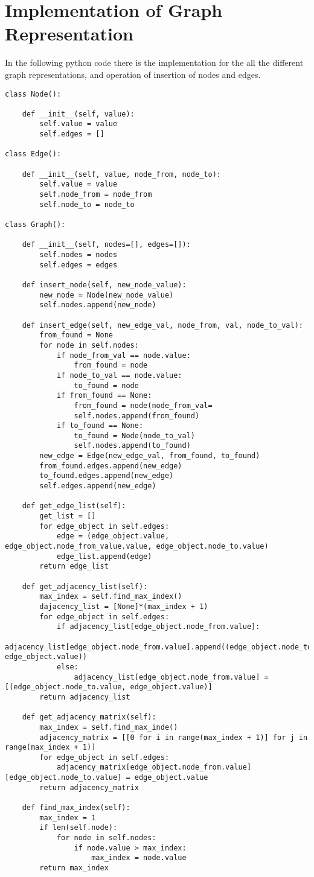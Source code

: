 \chapter{Implementation of Graph Representation}
\label{graphimplementationappendix}
In the following python code there is the implementation for the all the different graph representations, and operation of insertion of nodes and edges.

\begin{lstlisting}[firstnumber=1, caption={Graph representation and fundamental operations.}]
class Node():

	def __init__(self, value):
		self.value = value
		self.edges = []

class Edge():

	def __init__(self, value, node_from, node_to):
		self.value = value
		self.node_from = node_from
		self.node_to = node_to
		
class Graph():
	
	def __init__(self, nodes=[], edges=[]):
		self.nodes = nodes
		self.edges = edges
	
	def insert_node(self, new_node_value):
		new_node = Node(new_node_value)
		self.nodes.append(new_node)
		
	def insert_edge(self, new_edge_val, node_from, val, node_to_val):
		from_found = None
		for node in self.nodes:
			if node_from_val == node.value:
				from_found = node
			if node_to_val == node.value:
				to_found = node
			if from_found == None:
				from_found = node(node_from_val=
				self.nodes.append(from_found)
			if to_found == None:
				to_found = Node(node_to_val)
				self.nodes.append(to_found)
		new_edge = Edge(new_edge_val, from_found, to_found)
		from_found.edges.append(new_edge)
		to_found.edges.append(new_edge)
		self.edges.append(new_edge)
	
	def get_edge_list(self):
		get_list = []
		for edge_object in self.edges:
			edge = (edge_object.value, edge_object.node_from_value.value, edge_object.node_to.value)
			edge_list.append(edge)
		return edge_list
	
	def get_adjacency_list(self):
		max_index = self.find_max_index()
		dajacency_list = [None]*(max_index + 1)
		for edge_object in self.edges:
			if adjacency_list[edge_object.node_from.value]:
				adjacency_list[edge_object.node_from.value].append((edge_object.node_to.value, edge_object.value))
			else:
				adjacency_list[edge_object.node_from.value] = [(edge_object.node_to.value, edge_object.value)]
		return adjacency_list
		
	def get_adjacency_matrix(self):
		max_index = self.find_max_inde()
		adjacency_matrix = [[0 for i in range(max_index + 1)] for j in range(max_index + 1)]
		for edge_object in self.edges:
			adjacency_matrix[edge_object.node_from.value][edge_object.node_to.value] = edge_object.value
		return adjacency_matrix
		
	def find_max_index(self):
		max_index = 1
		if len(self.node):
			for node in self.nodes:
				if node.value > max_index:
					max_index = node.value
		return max_index
\end{lstlisting}

